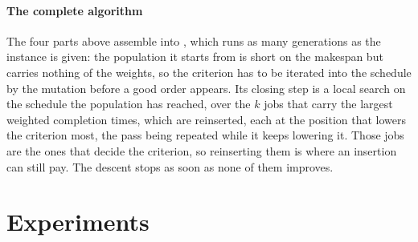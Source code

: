 \documentclass[12pt]{article}
\let\origsection\section
\renewcommand{\section}{\FloatBarrier\origsection}
\begin{document}
\begin{sloppypar}
        \paragraph{The complete algorithm}
        The four parts above assemble into , which runs as many generations as the
        instance is given: the population it starts from is short on the makespan but carries nothing
        of the weights, so the criterion has to be iterated into the schedule by the mutation before a
        good order appears. Its closing step is a local search on the
        schedule the population has reached, over the $k$ jobs that carry the largest weighted
        completion times, which are reinserted, each at the position that lowers the criterion most,
        the pass being repeated while it keeps lowering it. Those jobs are the ones that decide the
        criterion, so reinserting them is where an insertion can still pay. The descent stops as soon
        as none of them
        improves.
        
        \section{Experiments}
        \label{sec:experiments}
        
        \newcommand{\TBD}{\textcolor{red}{\textbf{TBD}}}
        

\end{sloppypar}
\end{document}
